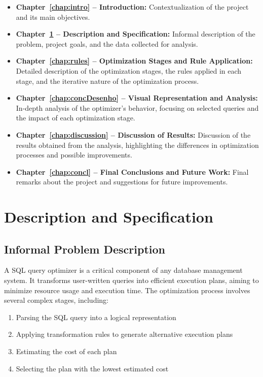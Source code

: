 \documentclass[a4paper,12pt]{scrreprt}
\begin{document}
\begin{itemize}
    \item \textbf{Chapter~\ref{chap:intro} -- Introduction:} Contextualization of the project and its main objectives.
    \item \textbf{Chapter~\ref{chap:analiseEspecificacao} -- Description and Specification:} Informal description of the problem, project goals, and the data collected for analysis.
    \item \textbf{Chapter~\ref{chap:rules} -- Optimization Stages and Rule Application:} Detailed description of the optimization stages, the rules applied in each stage, and the iterative nature of the optimization process.
    \item \textbf{Chapter~\ref{chap:concDesenho} -- Visual Representation and Analysis:} In-depth analysis of the optimizer's behavior, focusing on selected queries and the impact of each optimization stage.
    \item \textbf{Chapter~\ref{chap:discussion} -- Discussion of Results:} Discussion of the results obtained from the analysis, highlighting the differences in optimization processes and possible improvements.
    \item \textbf{Chapter~\ref{chap:concl} -- Final Conclusions and Future Work:} Final remarks about the project and suggestions for future improvements.
\end{itemize}

\chapter{Description and Specification}\label{chap:analiseEspecificacao}
\thispagestyle{fancy}
\section{Informal Problem Description}\label{sec:descricaoProblema}

A SQL query optimizer is a critical component of any database management system. It transforms user-written queries into efficient execution plans, aiming to minimize resource usage and execution time. The optimization process involves several complex stages, including:
\begin{enumerate}
    \item Parsing the SQL query into a logical representation
    \item Applying transformation rules to generate alternative execution plans
    \item Estimating the cost of each plan
    \item Selecting the plan with the lowest estimated cost
\end{enumerate}
\end{document}
